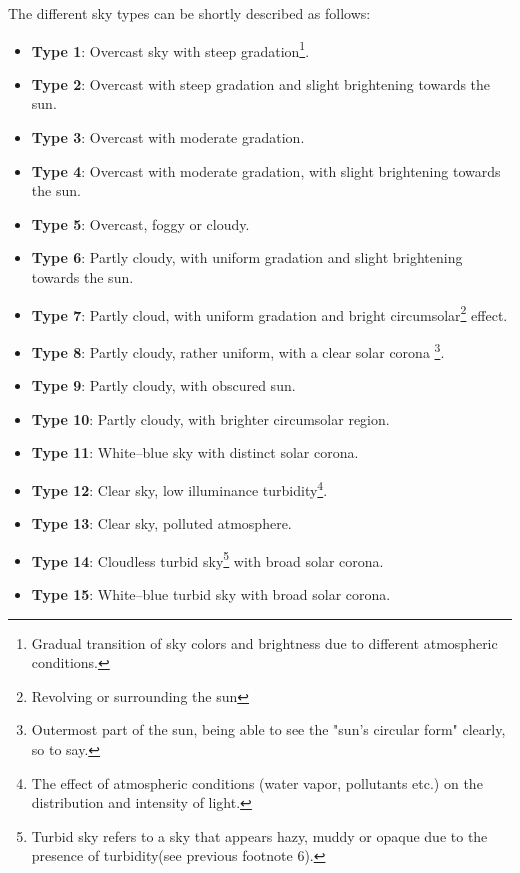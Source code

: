The different sky types can be shortly described as follows\cite{GARCIA2020468}:
\begin{itemize}
    \item \textbf{Type 1}: Overcast sky with steep gradation\footnote{Gradual transition of sky colors and brightness due to different atmospheric conditions.}.
    \item \textbf{Type 2}: Overcast with steep gradation and slight brightening towards the sun.
    \item \textbf{Type 3}: Overcast with moderate gradation.
    \item \textbf{Type 4}: Overcast with moderate gradation, with slight brightening towards the sun.
    \item \textbf{Type 5}: Overcast, foggy or cloudy.
    \item \textbf{Type 6}: Partly cloudy, with uniform gradation and slight brightening towards the sun.
    \item \textbf{Type 7}: Partly cloud, with uniform gradation and bright circumsolar\footnote{Revolving or surrounding the sun} effect.
    \item \textbf{Type 8}: Partly cloudy, rather uniform, with a clear solar corona \footnote{Outermost part of the sun, being able to see the "sun's circular form" clearly, so to say.}.
    \item \textbf{Type 9}: Partly cloudy, with obscured sun.
    \item \textbf{Type 10}: Partly cloudy, with brighter circumsolar region.
    \item \textbf{Type 11}: White–blue sky with distinct solar corona.
    \item \textbf{Type 12}: Clear sky, low illuminance turbidity\footnote{The effect of atmospheric conditions (water vapor, pollutants etc.) on the distribution and intensity of light.}.
    \item \textbf{Type 13}: Clear sky, polluted atmosphere.
    \item \textbf{Type 14}: Cloudless turbid sky\footnote{Turbid sky refers to a sky that appears hazy, muddy or opaque due to the presence of turbidity(see previous footnote 6).} with broad solar corona.
    \item \textbf{Type 15}: White–blue turbid sky with broad solar corona.
\end{itemize}

